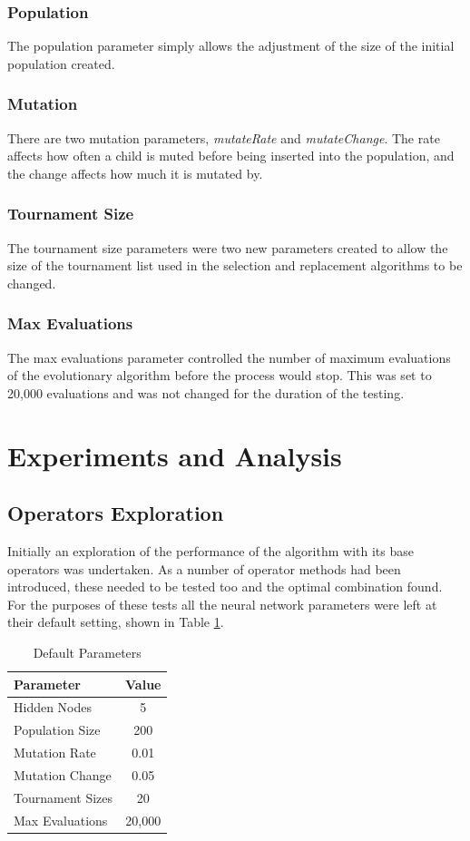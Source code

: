 \documentclass[sigconf]{acmart}
\begin{document}
\subsubsection{Population}
The population parameter simply allows the adjustment of the size of the initial population created.
\subsubsection{Mutation}
There are two mutation parameters, \textit{mutateRate} and \textit{mutateChange}. The rate affects how often a child is muted before being inserted into the population, and the change affects how much it is mutated by.
\subsubsection{Tournament Size}
The tournament size parameters were two new parameters created to allow the size of the tournament list used in the selection and replacement algorithms to be changed.
\subsubsection{Max Evaluations}
The max evaluations parameter controlled the number of maximum evaluations of the evolutionary algorithm before the process would stop. This was set to 20,000 evaluations and was not changed for the duration of the testing. 

\section{Experiments and Analysis}
\subsection{Operators Exploration}
Initially an exploration of the performance of the algorithm with its base operators was undertaken. As a number of operator methods had been introduced, these needed to be tested too and the optimal combination found. For the purposes of these tests all the neural network parameters were left at their default setting, shown in Table \ref{defparamstable}.

\begin{table}[!h]
	\renewcommand{\arraystretch}{1.3}
	\caption{Default Parameters}
	\label{defparamstable}
	\begin{tabular}{l|c}
		\toprule
		\textbf{Parameter} & \textbf{Value} \\ \midrule
		Hidden Nodes & 5\\ \hline
		Population Size & 200 \\ \hline
		Mutation Rate & 0.01\\ \hline
		Mutation Change & 0.05\\ \hline
		Tournament Sizes & 20 \\ \hline
		Max Evaluations & 20,000 \\ \bottomrule
	\end{tabular}
\end{table}
\end{document}
